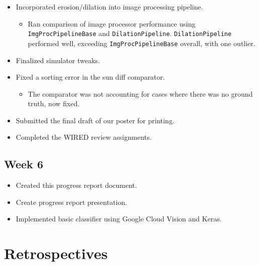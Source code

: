 \documentclass[10pt, onecolumn, draftclsnofoot, letterpaper, compsoc]{IEEEtran}
\begin{document}
    \begin{itemize}

	\item Incorporated erosion/dilation into image processing pipeline.

	\begin{itemize}
		\item Ran comparison of image processor performance using \texttt{ImgProcPipelineBase} and
		\texttt{DilationPipeline}. \texttt{DilationPipeline} performed well, exceeding \texttt{ImgProcPipelineBase}
		overall, with one outlier.
	\end{itemize}

	\item Finalized simulator tweaks.

	\item Fixed a sorting error in the sun diff comparator.

	\begin{itemize}
		\item The comparator was not accounting for cases where there was no ground truth, now fixed.
	\end{itemize}

	\item Submitted the final draft of our poster for printing.

	\item Completed the WIRED review assignments.

    \end{itemize}

\subsection{Week 6}

    \begin{itemize}

	\item Created this progress report document.

    \item Create progress report presentation.

    \item Implemented basic classifier using Google Cloud Vision and Keras.

    \end{itemize}

\newpage
\section{Retrospectives}
\end{document}
